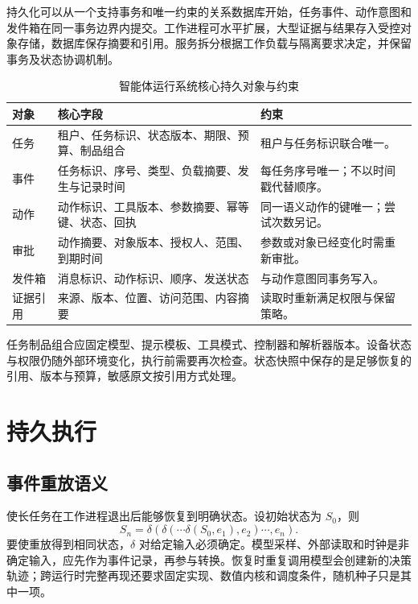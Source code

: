 \documentclass[../textbook.tex]{subfiles}
\begin{document}
持久化可以从一个支持事务和唯一约束的关系数据库开始，任务事件、动作意图和发件箱在同一事务边界内提交。工作进程可水平扩展，大型证据与结果存入受控对象存储，数据库保存摘要和引用。服务拆分根据工作负载与隔离要求决定，并保留事务及状态协调机制。

\begin{table}[htbp]
\centering
\caption{智能体运行系统核心持久对象与约束}
\label{tab:agent-runtime-records}
\begin{tabularx}{\linewidth}{@{}p{.20\linewidth}p{.39\linewidth}X@{}}
\toprule
对象 & 核心字段 & 约束\\
\midrule
任务 & 租户、任务标识、状态版本、期限、预算、制品组合 & 租户与任务标识联合唯一。\\
事件 & 任务标识、序号、类型、负载摘要、发生与记录时间 & 每任务序号唯一；不以时间戳代替顺序。\\
动作 & 动作标识、工具版本、参数摘要、幂等键、状态、回执 & 同一语义动作的键唯一；尝试次数另记。\\
审批 & 动作摘要、对象版本、授权人、范围、到期时间 & 参数或对象已经变化时需重新审批。\\
发件箱 & 消息标识、动作标识、顺序、发送状态 & 与动作意图同事务写入。\\
证据引用 & 来源、版本、位置、访问范围、内容摘要 & 读取时重新满足权限与保留策略。\\
\bottomrule
\end{tabularx}
\end{table}

任务制品组合应固定模型、提示模板、工具模式、控制器和解析器版本。设备状态与权限仍随外部环境变化，执行前需要再次检查。状态快照中保存的是足够恢复的引用、版本与预算，敏感原文按引用方式处理。

\section{持久执行}

\subsection{事件重放语义}
使长任务在工作进程退出后能够恢复到明确状态。设初始状态为 $S_0$，则
\begin{equation}
 S_n=\delta(\delta(\cdots\delta(S_0,e_1),e_2)\cdots,e_n).
 \label{eq:runtime-fold}
\end{equation}
要使重放得到相同状态，$\delta$ 对给定输入必须确定。模型采样、外部读取和时钟是非确定输入，应先作为事件记录，再参与转换。恢复时重复调用模型会创建新的决策轨迹；跨运行时完整再现还要求固定实现、数值内核和调度条件，随机种子只是其中一项。
\end{document}
